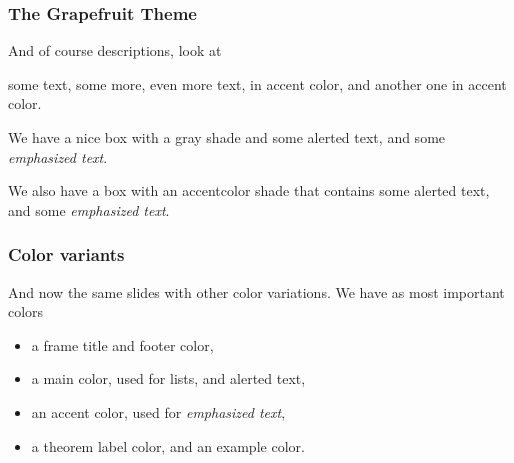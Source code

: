 \documentclass[aspectratio=43,usenames,dvipsnames,t]{beamer}
\begin{document}
\begin{frame}[label=thirdframe]
\frametitle{The \textbf{Grapefruit} Theme}

And of course descriptions, look at
\begin{description}
   some text,
   some more,
   even more text,
   in accent color, and
   another one in accent color.
\end{description}

\begin{shadebox}
  We have a nice box with a gray shade and some \alert{alerted text}, and some \emph{emphasized text}.
\end{shadebox}

\begin{accentbox}
  We also have a box with an accentcolor shade that contains some \alert{alerted text}, and some \emph{emphasized text}.
\end{accentbox}
 
 \end{frame}



\begin{frame}
\frametitle{Color variants}

And now the same slides with other color variations.
We have as most important colors
\begin{itemize}
 \item a frame title and footer color,
 \item a main color, used for lists, and \alert{alerted text},
 \item an accent color, used for \emph{emphasized text},
 \item a theorem label color, and an example color.
\end{itemize}

\end{frame}


\end{document}
